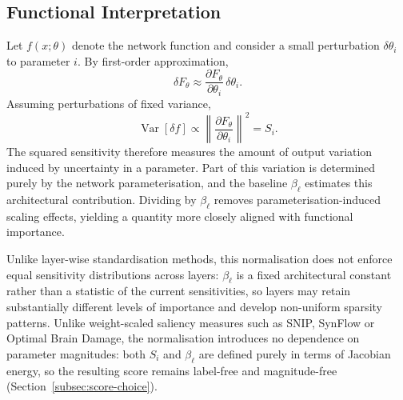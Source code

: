 \documentclass{article}
\theoremstyle{definition}
\theoremstyle{remark}
\begin{document}
\subsection{Functional Interpretation}

Let $f(x;\theta)$ denote the network function and consider a small perturbation $\delta\theta_i$ to parameter $i$. By first-order approximation,
\begin{equation}
\delta F_\theta
\approx
\frac{\partial F_\theta}{\partial \theta_i}
\,\delta\theta_i.
\end{equation}
Assuming perturbations of fixed variance,
\begin{equation}
\operatorname{Var}[\delta f]
\propto
\left\|
\frac{\partial F_\theta}{\partial \theta_i}
\right\|^2
=
S_i.
\end{equation}
The squared sensitivity therefore measures the amount of output variation induced by uncertainty in a parameter. Part of this variation is determined purely by the network parameterisation, and the baseline $\beta_{\ell}$ estimates this architectural contribution. Dividing by $\beta_{\ell}$ removes parameterisation-induced scaling effects, yielding a quantity more closely aligned with functional importance.

Unlike layer-wise standardisation methods, this normalisation does not enforce
equal sensitivity distributions across layers: $\beta_\ell$ is a fixed
architectural constant rather than a statistic of the current sensitivities, so
layers may retain substantially different levels of importance and develop
non-uniform sparsity patterns. Unlike weight-scaled saliency measures such as
SNIP, SynFlow or Optimal Brain Damage, the normalisation introduces no
dependence on parameter magnitudes: both $S_i$ and $\beta_\ell$ are defined
purely in terms of Jacobian energy, so the resulting score remains label-free
and magnitude-free (Section~\ref{subsec:score-choice}).
\end{document}
